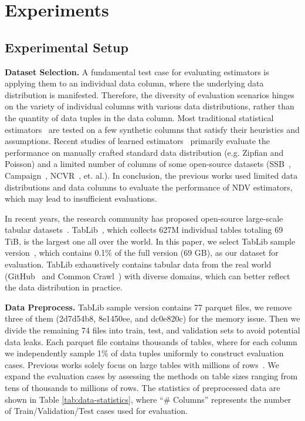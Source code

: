 \section{Experiments}\label{sec:exp}

\subsection{Experimental Setup}\label{sec:exp-settings}
\noindent\textbf{Dataset Selection.} 
A fundamental test case for evaluating estimators is applying them to an individual data column, where the underlying data distribution is manifested. Therefore, the diversity of evaluation scenarios hinges on the variety of individual columns with various data distributions, 
rather than the quantity of data tuples in the data column.
Most traditional statistical estimators~\cite{goodman1949estimation,gee_charikar2000towards,error_bound,chao_in_db_ozsoyoglu1991estimating,chao1984nonparametric,shlosser1981estimation,chaolee,hybskew_haas1995sampling,sichel1986parameter,sichel1986word,sichel1992anatomy,mmo_bunge1993estimating,bootstrap_smith1984nonparametric,horvitz_sarndal1992model,hybskew_haas1995sampling} are tested on a few synthetic columns that satisfy their heuristics and assumptions. 
Recent studies of learned estimators~\cite{li2022sampling,ls_wu2022learning} primarily evaluate the performance on manually crafted standard data distribution (e.g. Zipfian and Poisson) and a limited number of columns of some open-source datasets (SSB~\cite{ssb_o2009star}, Campaign~\cite{Campaign}, NCVR~\cite{NCVR}, et. al.). 
In conclusion, the previous works used limited data distributions and data columns to evaluate the performance of NDV estimators, which may lead to insufficient evaluations.

In recent years, the research community has proposed open-source large-scale tabular datasets~\cite{hulsebos2023gittables,eggert2023tablib}. 
TabLib~\cite{eggert2023tablib}, which collects 627M individual tables totaling 69 TiB, is the largest one all over the world. 
In this paper, we select TabLib sample version~\cite{tablib-v1-sample}, which contains 0.1\% of the full version (69 GB), as our dataset for evaluation. 
TabLib exhaustively contains tabular data from the real world (GitHub~\cite{github} and Common Crawl~\cite{commoncrawl}) with diverse domains,  which can better reflect the data distribution in practice.


\noindent\textbf{Data Preprocess.} TabLib sample version contains 77 parquet files, we remove three of them (2d7d54b8, 8e1450ee, and dc0e820c) for the memory issue. Then we divide the remaining 74 files into train, test, and validation sets to avoid potential data leaks. 
Each parquet file contains thousands of tables, where for each column we independently sample 1\% of data tuples uniformly to construct evaluation cases. 
{Previous works solely focus on large tables with millions of rows~\cite{ls_wu2022learning,li2024learning}. We expand the evaluation cases by assessing the methods on table sizes ranging from tens of thousands to millions of rows.}
The statistics of preprocessed data are shown in Table \ref{tab:data-statistics}, where ``\# Columns'' represents the number of Train/Validation/Test cases used for evaluation.


